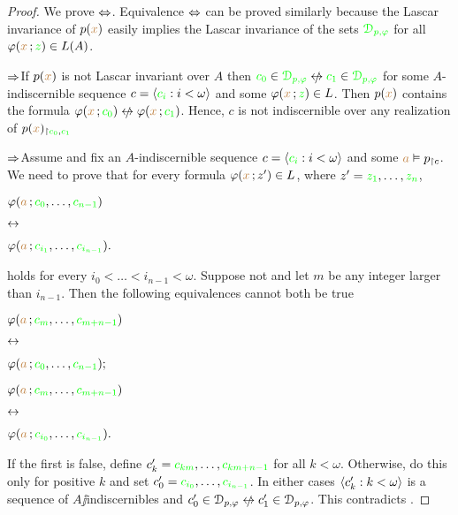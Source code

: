 \documentclass[creche.tex]{subfiles}
\begin{document}
\begin{proof} We prove $\Leftrightarrow$. Equivalence  $\Leftrightarrow$ can be proved similarly because the Lascar invariance of $p({\color{brown} x})$ easily implies the Lascar invariance of the sets ${\color{green}\EuScript D_{p,\varphi}}$ for all $\varphi({\color{brown} x}\,;{\color{green} z})\in L(A)$.

  \def\ceq#1#2#3{\parbox[t]{30ex}{$\displaystyle #1$}\parbox[t]{5ex}{$\displaystyle\hfil #2$}{$\displaystyle #3$}}
  $\Rightarrow$\quad If $p({\color{brown} x})$ is not Lascar invariant over $A$ then ${\gr c_0}\in{\gr\D_{p,\phi}}\niff {\gr c_1}\in{\gr\D_{p,\phi}}$ for some $A$-indiscernible sequence $c=\langle{\color{green}c_i}:i<\omega\rangle$ and some $\varphi({\color{brown} x}\,;{\color{green} z})\in L$. Then $p({\color{brown} x})$ contains the formula $\phi({\mr x}\,;{\gr c_0})\niff \phi({\mr x}\,;{\gr c_1})$. Hence, $c$ is not indiscernible over any realization of $p({\color{brown} x})_{\restriction{\color{green}c_0},{\color{green} c_1}}$ 
  
  $\Rightarrow$\quad Assume  and fix an $A$-indiscernible sequence $c=\langle{\color{green}c_i}:i<\omega\rangle$ and some ${\color{brown} a}\vDash p_{\restriction c}$. We need to prove that for every formula $\varphi({\color{brown} x}\,;z')\in L$, where $z'={\color{green} z_1},\dots,{\color{green} z_n}$,

  \ceq{\hfill\phi({\mr a}\,;{\gr c_{0}},\dots,{\gr c_{n-1}})}{\iff}{\phi({\mr a}\,;{\gr c_{i_1}},\dots,{\gr c_{i_{n-1}}}).}

  holds for every $i_0<\dots<i_{n-1}<\omega$. Suppose not and let $m$ be any integer larger than $i_{n-1}$. Then the following equivalences cannot both be true

  \ceq{\hfill\phi({\mr a}\,;{\gr c_m},\dots,{\gr c_{m+n-1}})}{\iff}{\phi({\mr a}\,;{\gr c_0},\dots,{\gr c_{n-1}});}


  \ceq{\hfill\phi({\mr a}\,;{\gr c_m},\dots,{\gr c_{m+n-1}})}{\iff}{\phi({\mr a}\,;{\gr c_{i_0}},\dots,{\gr c_{i_{n-1}}}).}

  If the first is false, define $c'_k={\color{green} c_{km}},\dots,{\color{green} c_{km+n-1}}$ for all $k<\omega$. Otherwise, do this only for positive $k$ and set $c'_0={\color{green} c_{i_0}},\dots,{\color{green} c_{i_{n-1}}}$. In either cases $\langle c'_k:k<\omega\rangle$ is a sequence of $A\jj$in\-dis\-cern\-i\-bles and $c'_0\in\D_{p,\phi}\niff c'_1\in\D_{p,\phi}$. This contradicts .
\end{proof}
\end{document}
